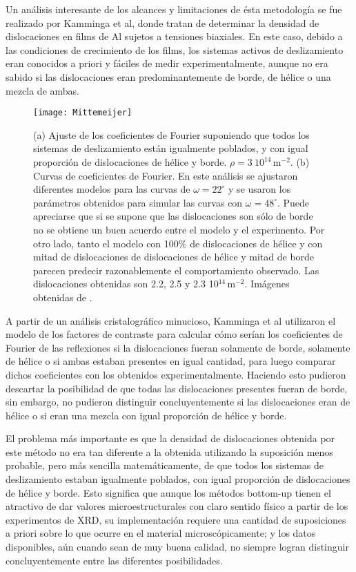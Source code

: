 Un análisis interesante de los alcances y limitaciones de ésta metodología se fue realizado por Kamminga et al\cite{mittemeijer2003diffraction}, donde tratan de determinar la densidad de dislocaciones en films de Al sujetos a tensiones biaxiales.
En este caso, debido a las condiciones de crecimiento de los films, los sistemas activos de deslizamiento eran conocidos a priori y fáciles de medir experimentalmente, aunque no era sabido si las dislocaciones eran predominantemente de borde, de hélice o una mezcla de ambas.

\begin{figure}[!htb]
  \centering
  \texttt{[image: Mittemeijer]}
  \caption{(a) Ajuste de los coeficientes de Fourier suponiendo que todos los sistemas de deslizamiento están igualmente poblados, y con igual proporción de dislocaciones de hélice y borde. $\rho = 3 \ 10^{14}$\,m$^{-2}$. (b) Curvas de coeficientes de Fourier. En este análisis se ajustaron diferentes modelos para las curvas de $\omega = 22^{\circ}$ y se usaron los parámetros obtenidos para simular las curvas con $\omega = 48^{\circ}$. Puede apreciarse que si se supone que las dislocaciones son sólo de borde no se obtiene un buen acuerdo entre el modelo y el experimento. Por otro lado, tanto el modelo con 100\% de dislocaciones de hélice y con mitad de dislocaciones de dislocaciones de hélice y mitad de borde parecen predecir razonablemente el comportamiento observado. Las dislocaciones obtenidas son 2.2, 2.5 y 2.3 10$^{14}$\,m$^{-2}$. Imágenes obtenidas de \cite{mittemeijer2003diffraction}.}
  \label{fig:FourierMittemeijer}
\end{figure}

A partir de un análisis cristalográfico minucioso, Kamminga et al utilizaron el modelo de los factores de contraste para calcular cómo serían los coeficientes de Fourier de las reflexiones si la dislocaciones fueran solamente de borde, solamente de hélice o si ambas estaban presentes en igual cantidad, para luego comparar dichos coeficientes con los obtenidos experimentalmente.
Haciendo esto pudieron descartar la posibilidad de que todas las dislocaciones presentes fueran de borde, sin embargo, no pudieron distinguir concluyentemente si las dislocaciones eran de hélice o si eran una mezcla con igual proporción de hélice y borde.

El problema más importante es que la densidad de dislocaciones obtenida por este método no era tan diferente a la obtenida utilizando la suposición menos probable, pero más sencilla matemáticamente, de que todos los sistemas de deslizamiento estaban igualmente poblados, con igual proporción de dislocaciones de hélice y borde.
Esto significa que aunque los métodos bottom-up tienen el atractivo de dar valores microestructurales con claro sentido físico a partir de los experimentos de XRD, su implementación requiere una cantidad de suposiciones a priori sobre lo que ocurre en el material microscópicamente; y los datos disponibles, aún cuando sean de muy buena calidad, no siempre logran distinguir concluyentemente entre las diferentes posibilidades.

